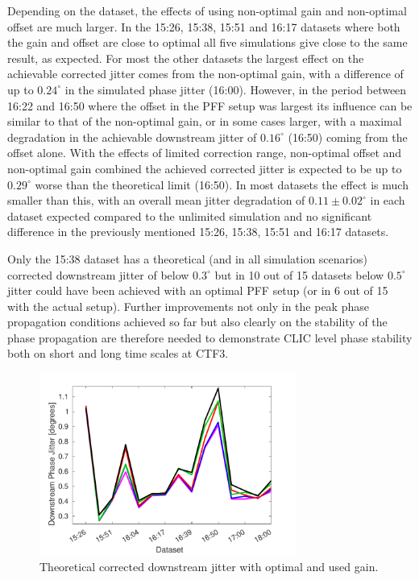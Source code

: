 Depending on the dataset, the effects of using non-optimal gain and non-optimal offset are much larger. In the 15:26, 15:38, 15:51 and 16:17 datasets where both the gain and offset are close to optimal all five simulations give close to the same result, as expected. For most the other datasets the largest effect on the achievable corrected jitter comes from the non-optimal gain, with a difference of up to \(0.24^\circ\) in the simulated phase jitter (16:00). However, in the period between 16:22 and 16:50 where the offset in the PFF setup was largest its influence can be similar to that of the non-optimal gain, or in some cases larger, with a maximal degradation in the achievable downstream jitter of \(0.16^\circ\) (16:50) coming from the offset alone. With the effects of limited correction range, non-optimal offset and non-optimal gain combined the achieved corrected jitter is expected to be up to \(0.29^\circ\) worse than the theoretical limit (16:50). In most datasets the effect is much smaller than this, with an overall mean jitter degradation of \(0.11\pm0.02^\circ\) in each dataset expected compared to the unlimited simulation and no significant difference in the previously mentioned 15:26, 15:38, 15:51 and 16:17 datasets. 

Only the 15:38 dataset has a theoretical (and in all simulation scenarios) corrected downstream jitter of below \(0.3^\circ\) but in 10 out of 15 datasets below \(0.5^\circ\) jitter could have been achieved with an optimal PFF setup (or in 6 out of 15 with the actual setup). Further improvements not only in the peak phase propagation conditions achieved so far but also clearly on the stability of the phase propagation are therefore needed to demonstrate CLIC level phase stability both on short and long time scales at CTF3.

\begin{figure}
  \centering
  \includegraphics[width=0.75\textwidth]{Figures/feedforward/longFF_datSetJitSim}
  \caption{Theoretical corrected downstream jitter with optimal and used gain.}
  \label{f:longFF_datSetJitSim}
\end{figure}

